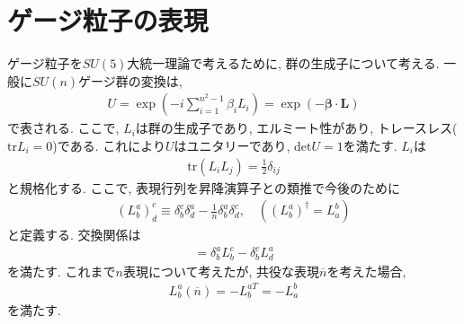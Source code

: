 \section{ゲージ粒子の表現}
ゲージ粒子を$SU(5)$大統一理論で考えるために, 群の生成子について考える.
一般に$SU(n)$ゲージ群の変換は, 
\begin{align}
  U =\exp\left(-i \sum_{i=1}^{n^2-1}\beta_i L_i\right)=\exp(-\bm{\beta}\cdot \bm{L})
\end{align}
で表される.
ここで, $L_i$は群の生成子であり, エルミート性があり, トレースレス($\mathrm{tr} L_i =0$)である.
これにより$U$はユニタリーであり, $\mathrm{det}U =1$を満たす.
$L_i$は
\begin{align}
  \mathrm{tr}(L_iL_j) = \frac{1}{2}{\delta_{ij}}\label{reguralization}
\end{align}
と規格化する.
ここで, 表現行列を昇降演算子との類推で今後のために
\begin{align}
  (L^a_b)^c_d \equiv \delta^c_b\delta^a_d -\frac{1}{n}\delta^a_b\delta^c_d,\quad ((L^a_b)^\dagger=L^b_a)
\end{align}
と定義する.
交換関係は
\begin{align}
  [L^a_b,L^c_d] = \delta^a_bL^c_b - \delta^c_bL^a_d
\end{align}
を満たす.
これまで$n$表現について考えたが, 共役な表現$\overline{n}$を考えた場合,
\begin{align}
  L^a_b(\overline{n}) = -L^{aT}_b = -L^b_a
\end{align}
を満たす.

